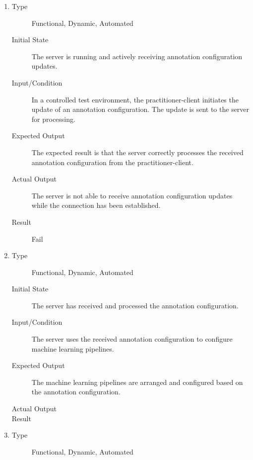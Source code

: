 \documentclass[12pt, titlepage]{article}
\begin{document}
\begin{enumerate}[FR-T1]
  \item \label{FRT7}
    \begin{description}
    \item[Type] Functional, Dynamic, Automated
    \item[Initial State] The server is running and actively receiving annotation
      configuration updates.
    \item[Input/Condition] In a controlled test environment, the practitioner-client
      initiates the update of an annotation configuration. The update is sent to
      the server for processing.
    \item[Expected Output] The expected result is that the server correctly processes
      the received annotation configuration from the practitioner-client.
    \item[Actual Output] The server is not able to receive annotation
    configuration updates while the connection has been established.
    \item[Result] Fail
    \end{description}
  \item \label{FRT8}
    \begin{description}
    \item[Type] Functional, Dynamic, Automated
    \item[Initial State] The server has received and processed the annotation
      configuration.
    \item[Input/Condition] The server uses the received annotation configuration to
      configure machine learning pipelines.
    \item[Expected Output] The machine learning pipelines are arranged and configured
      based on the annotation configuration.
    \item[Actual Output] 
    \item[Result] 
    \end{description}
  \item \label{FRT9}
    \begin{description}
    \item[Type] Functional, Dynamic, Automated

\end{description}
\end{enumerate}
\end{document}

